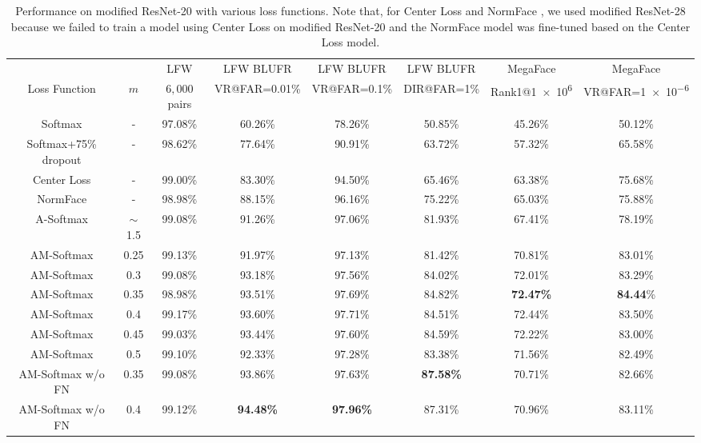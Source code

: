 \documentclass[10pt,twocolumn,letterpaper]{article}
\begin{document}
\begin{table*}
	\centering
	\footnotesize
	\begin{threeparttable}
		\label{tab:performance}
		\begin{tabular}{cccccccc}
			\toprule
			& & LFW\cite{huang2007labeled} & LFW BLUFR\cite{liao2014benchmark} & LFW BLUFR\cite{liao2014benchmark} & LFW BLUFR\cite{liao2014benchmark} & MegaFace\cite{kemelmacher2016megaface} & MegaFace\cite{kemelmacher2016megaface} \\
			Loss Function & $m$ & $6,000$ pairs & VR@FAR=0.01\%  & VR@FAR=0.1\% & DIR@FAR=1\% & Rank1@\num{1e6} & VR@FAR=\num{1e-6} \\
			\midrule
			Softmax & - & 97.08\% & 60.26\% & 78.26\% & 50.85\% & 45.26\% & 50.12\% \\
			Softmax+75\% dropout & - & 98.62\% & 77.64\% & 90.91\% & 63.72\% & 57.32\% & 65.58\% \\
			Center Loss \cite{wen2016discriminative} & - & 99.00\% & 83.30\% & 94.50\% & 65.46\% & 63.38\% & 75.68\%\\
			NormFace \cite{wang2017normface} & - & 98.98\% & 88.15\% & 96.16\% & 75.22\% & 65.03\% & 75.88\%\\
			A-Softmax \cite{liu2017sphereface} & $\sim$1.5 & 99.08\% & 91.26\% & 97.06\% & 81.93\% & 67.41\% & 78.19\% \\
			\midrule
			AM-Softmax & 0.25 & 99.13\% & 91.97\% & 97.13\% & 81.42\% & 70.81\% & 83.01\%\\
			AM-Softmax & 0.3 & 99.08\% & 93.18\% & 97.56\% & 84.02\% & 72.01\% & 83.29\% \\
			AM-Softmax & 0.35 & 98.98\% & 93.51\% & 97.69\% & 84.82\% & \textbf{72.47\%} & \textbf{84.44}\% \\
			AM-Softmax & 0.4 & 99.17\% & 93.60\% & 97.71\% & 84.51\% & 72.44\% & 83.50\%\\
			AM-Softmax & 0.45 & 99.03\% & 93.44\% & 97.60\% & 84.59\% & 72.22\% & 83.00\% \\
			AM-Softmax & 0.5 & 99.10\% & 92.33\% & 97.28\% & 83.38\% & 71.56\% & 82.49\%\\
			\midrule
			AM-Softmax w/o FN　& 0.35 & 99.08\% & 93.86\% & 97.63\% & \textbf{87.58\%} & 70.71\% & 82.66\%\\
			AM-Softmax w/o FN　& 0.4 & 99.12\% & \textbf{94.48\%} & \textbf{97.96\%} & 87.31\% & 70.96\% & 83.11\% \\
			\bottomrule
		\end{tabular}
		\vspace{1mm}
		\caption{Performance on modified ResNet-20 with various loss functions. Note that, for Center Loss \cite{wen2016discriminative} and NormFace \cite{wang2017normface}, we used modified ResNet-28 \cite{wen2016discriminative} because we failed to train a model using Center Loss on modified ResNet-20 \cite{liu2017sphereface} and the NormFace model was fine-tuned based on the Center Loss model.}
	\end{threeparttable}
\end{table*}
\end{document}
